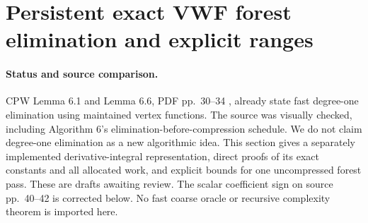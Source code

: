 \section[Persistent VWF forests]{Persistent exact VWF forest elimination and explicit ranges}
\label{sec:op3-persistent-vwf-forest}

\paragraph{Status and source comparison.}
CPW Lemma 6.1 and Lemma 6.6, PDF pp.\ 30--34
\citep{chen2021diffusion}, already state fast degree-one elimination using
maintained vertex functions. The source was visually checked, including
Algorithm 6's elimination-before-compression schedule. We do not claim
degree-one elimination as a new algorithmic idea. This section gives a
separately implemented derivative-integral representation, direct proofs
of its exact constants and all allocated work, and explicit bounds for one
uncompressed forest pass. These are \statusproved{} drafts awaiting review.
The scalar coefficient sign on source pp.\ 40--42 is corrected below.
No fast coarse oracle or recursive complexity theorem is imported here.

